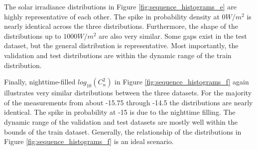 The solar irradiance distributions in Figure \ref{fig:sequence_histograms_e} are highly representative of each other. The spike in probability density at $0 W/m^{2}$ is nearly identical across the three distributions. Furthermore, the shape of the distributions up to $1000 W/m^{2}$ are also very similar. Some gaps exist in the test dataset, but the general distribution is representative. Most importantly, the validation and test distributions are within the dynamic range of the train distribution.

Finally, nighttime-filled $log_{10}(C_{n}^{2})$ in Figure \ref{fig:sequence_histograms_f} again illustrates very similar distributions between the three datasets. For the majority of the measurements from about -15.75 through -14.5 the distributions are nearly identical. The spike in probability at -15 is due to the nighttime filling. The dynamic range of the validation and test datasets are mostly well within the bounds of the train dataset. Generally, the relationship of the distributions in Figure \ref{fig:sequence_histograms_f} is an ideal scenario.

